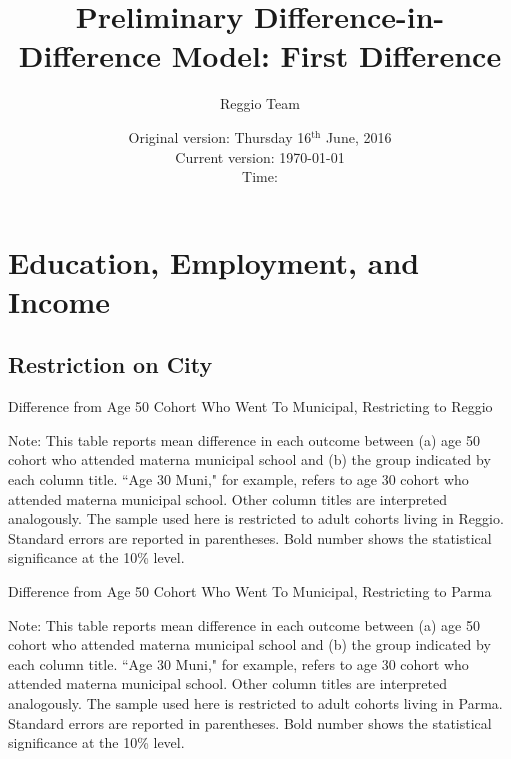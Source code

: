 \documentclass[11pt]{article}
\begin{document}
\title{Preliminary Difference-in-Difference Model: First Difference}
\author{Reggio Team}
\date{Original version: Thursday  16$^{\text{th}}$ June, 2016 \\ Current version: \today \\ \vspace{1em} Time: \currenttime}
\maketitle

\listoftables

\doublespacing


\section{Education, Employment, and Income}
\subsection{Restriction on City}
\begin{table}[H]
\begin{center}
	\caption{Difference from Age 50 Cohort Who Went To Municipal, Restricting to Reggio}
	\scalebox{0.83}{
		}
\end{center}
\footnotesize
Note: This table reports mean difference in each outcome between (a) age 50 cohort who attended materna municipal school and (b) the group indicated by each column title. ``Age 30 Muni," for example, refers to age 30 cohort who attended materna municipal school. Other column titles are interpreted analogously. The sample used here is restricted to adult cohorts living in Reggio. Standard errors are reported in parentheses. Bold number shows the statistical significance at the 10\% level. 
\end{table}

\begin{table}[H]
\begin{center}
	\caption{Difference from Age 50 Cohort Who Went To Municipal, Restricting to Parma}
	\scalebox{0.83}{
		}
\end{center}
\footnotesize
Note: This table reports mean difference in each outcome between (a) age 50 cohort who attended materna municipal school and (b) the group indicated by each column title. ``Age 30 Muni," for example, refers to age 30 cohort who attended materna municipal school. Other column titles are interpreted analogously. The sample used here is restricted to adult cohorts living in Parma. Standard errors are reported in parentheses. Bold number shows the statistical significance at the 10\% level. 
\end{table}
\end{document}
